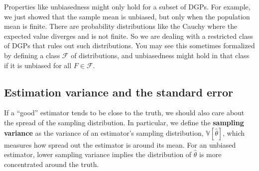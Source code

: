 \documentclass[
  letterpaper,
  DIV=11,
  numbers=noendperiod]{scrreprt}
\newcommand{\V}{\mathbb{V}}
\theoremstyle{definition}
\theoremstyle{plain}
\theoremstyle{definition}
\theoremstyle{remark}
\begin{document}
\begin{tcolorbox}[enhanced jigsaw, title=\textcolor{quarto-callout-warning-color}{\faExclamationTriangle}\hspace{0.5em}{Warning}, breakable, titlerule=0mm, opacityback=0, rightrule=.15mm, bottomrule=.15mm, colframe=quarto-callout-warning-color-frame, coltitle=black, colbacktitle=quarto-callout-warning-color!10!white, bottomtitle=1mm, toptitle=1mm, colback=white, arc=.35mm, opacitybacktitle=0.6, toprule=.15mm, leftrule=.75mm, left=2mm]

Properties like unbiasedness might only hold for a subset of DGPs. For
example, we just showed that the sample mean is unbiased, but only when
the population mean is finite. There are probability distributions like
the Cauchy where the expected value diverges and is not finite. So we
are dealing with a restricted class of DGPs that rules out such
distributions. You may see this sometimes formalized by defining a class
\(\mathcal{F}\) of distributions, and unbiasedness might hold in that
class if it is unbiased for all \(F \in \mathcal{F}\).

\end{tcolorbox}

\hypertarget{estimation-variance-and-the-standard-error}{%
\subsection{Estimation variance and the standard
error}\label{estimation-variance-and-the-standard-error}}

If a ``good'' estimator tends to be close to the truth, we should also
care about the spread of the sampling distribution. In particular, we
define the \textbf{sampling variance} as the variance of an estimator's
sampling distribution, \(\V[\widehat{\theta}]\), which measures how
spread out the estimator is around its mean. For an unbiased estimator,
lower sampling variance implies the distribution of \(\widehat{\theta}\)
is more concentrated around the truth.
\end{document}
